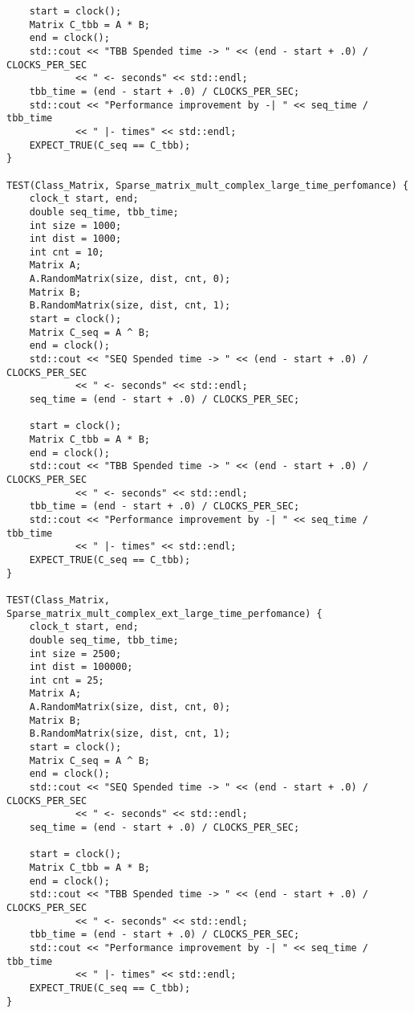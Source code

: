 \documentclass[12pt]{report}
\begin{document}
\begin{lstlisting}
    start = clock();
    Matrix C_tbb = A * B;
    end = clock();
    std::cout << "TBB Spended time -> " << (end - start + .0) / CLOCKS_PER_SEC
            << " <- seconds" << std::endl;
    tbb_time = (end - start + .0) / CLOCKS_PER_SEC;
    std::cout << "Performance improvement by -| " << seq_time / tbb_time
            << " |- times" << std::endl;
    EXPECT_TRUE(C_seq == C_tbb);
}

TEST(Class_Matrix, Sparse_matrix_mult_complex_large_time_perfomance) {
    clock_t start, end;
    double seq_time, tbb_time;
    int size = 1000;
    int dist = 1000;
    int cnt = 10;
    Matrix A;
    A.RandomMatrix(size, dist, cnt, 0);
    Matrix B;
    B.RandomMatrix(size, dist, cnt, 1);
    start = clock();
    Matrix C_seq = A ^ B;
    end = clock();
    std::cout << "SEQ Spended time -> " << (end - start + .0) / CLOCKS_PER_SEC
            << " <- seconds" << std::endl;
    seq_time = (end - start + .0) / CLOCKS_PER_SEC;

    start = clock();
    Matrix C_tbb = A * B;
    end = clock();
    std::cout << "TBB Spended time -> " << (end - start + .0) / CLOCKS_PER_SEC
            << " <- seconds" << std::endl;
    tbb_time = (end - start + .0) / CLOCKS_PER_SEC;
    std::cout << "Performance improvement by -| " << seq_time / tbb_time
            << " |- times" << std::endl;
    EXPECT_TRUE(C_seq == C_tbb);
}

TEST(Class_Matrix, Sparse_matrix_mult_complex_ext_large_time_perfomance) {
    clock_t start, end;
    double seq_time, tbb_time;
    int size = 2500;
    int dist = 100000;
    int cnt = 25;
    Matrix A;
    A.RandomMatrix(size, dist, cnt, 0);
    Matrix B;
    B.RandomMatrix(size, dist, cnt, 1);
    start = clock();
    Matrix C_seq = A ^ B;
    end = clock();
    std::cout << "SEQ Spended time -> " << (end - start + .0) / CLOCKS_PER_SEC
            << " <- seconds" << std::endl;
    seq_time = (end - start + .0) / CLOCKS_PER_SEC;

    start = clock();
    Matrix C_tbb = A * B;
    end = clock();
    std::cout << "TBB Spended time -> " << (end - start + .0) / CLOCKS_PER_SEC
            << " <- seconds" << std::endl;
    tbb_time = (end - start + .0) / CLOCKS_PER_SEC;
    std::cout << "Performance improvement by -| " << seq_time / tbb_time
            << " |- times" << std::endl;
    EXPECT_TRUE(C_seq == C_tbb);
}

\end{lstlisting}
\end{document}
